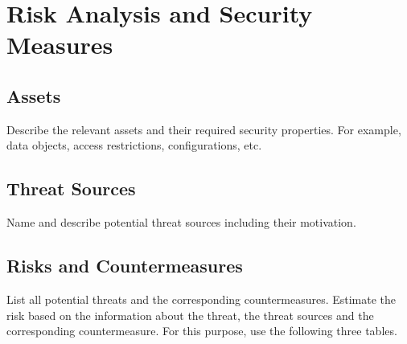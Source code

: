 \section{Risk Analysis and Security Measures}

\subsection{Assets}

Describe the relevant assets and their required security
  properties. For example, data objects, access restrictions,
  configurations, etc.

\subsection{Threat Sources}

Name and describe potential threat sources including their motivation.

\subsection{Risks and Countermeasures}

List all potential threats and the
  corresponding countermeasures. Estimate the risk based on 
  the information about the threat, the threat sources and the 
  corresponding countermeasure. For this purpose, use the following three
  tables.


